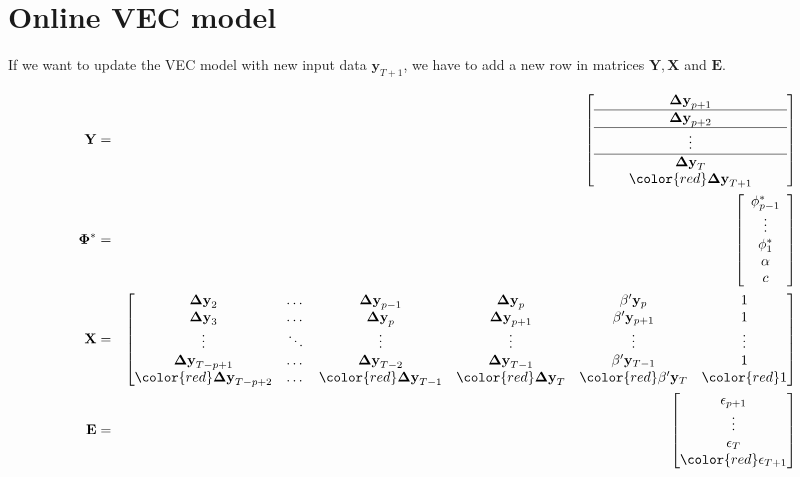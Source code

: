 \section{Online VEC model}

If we want to update the VEC model with new input data
$\mathbf{y}_{T+1}$, we have to add a new row in matrices
$\mathbf{Y,X}$ and $\mathbf{E}$. 

\begin{eqnarray}
\mathbf{Y} &=& 
                \left[ \begin{array}{ccc}
               \quad & \mathbf{\Delta y}_{p+1} & \quad \\ \hline
               \quad & \mathbf{\Delta y}_{p+2} & \quad \\ \hline
               \quad & \vdots & \quad \\ \hline 
               \quad & \mathbf{\Delta y}_T & \quad \\ 
               \quad & \color{red}\mathbf{\Delta y}_{T+1} & \quad 
               \end{array} \right]
             \\
\mathbf{\Phi^*} &=& 
                \left[ \begin{array}{ccc}
               \phi_{p-1}^* \\ 
               \vdots \\ 
               \phi_{1}^* \\
               \alpha \\
                c   
               \end{array} \right]
\\
\mathbf{X} &=& \begin{bmatrix} \label{offX}
   \mathbf{\Delta y}_2 & \dots & \mathbf{\Delta y}_{p-1} &
   \mathbf{\Delta y}_{p} & \beta'\mathbf{y}_{p} & 1\\
   \mathbf{\Delta y}_3 & \dots & \mathbf{\Delta y}_{p} &
   \mathbf{\Delta y}_{p+1} & \beta'\mathbf{y}_{p+1} &1\\
   \vdots &  \ddots & \vdots & \vdots & \vdots & \vdots\\
   \mathbf{\Delta y}_{T-p+1} & \dots & \mathbf{\Delta y}_{T-2} &
   \mathbf{\Delta y}_{T-1} & \beta'\mathbf{y}_{T-1} &1 \\
   \color{red} \mathbf{\Delta y}_{T-p+2} & \dots & \color{red}\mathbf{\Delta y}_{T-1} &
   \color{red}\mathbf{\Delta y}_{T} & \color{red}\beta'\mathbf{y}_{T}
   & \color{red} 1
   \end{bmatrix}
\\
\mathbf{E} &=& \begin{bmatrix}
              \mathbf{\epsilon}_{p+1} \\ \vdots \\ \mathbf{\epsilon}_T
              \\ \color{red}\mathbf{\epsilon}_{T+1}
             \end{bmatrix}
\end{eqnarray}
